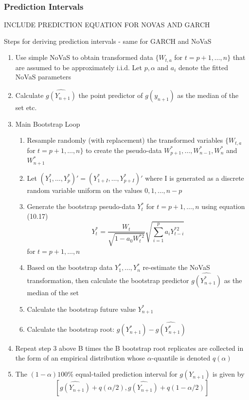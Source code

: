 \documentclass{beamer}
\begin{document}
\begin{frame}
\frametitle{Prediction Intervals}
INCLUDE PREDICTION EQUATION FOR NOVAS AND GARCH

Steps for deriving prediction intervals - same for GARCH and NoVaS

\begin{enumerate}
\item{Use simple NoVaS to obtain transformed data $\{W_{t,a}$ for $t=p+1,\dots,n \}$ that are assumed to be approximately i.i.d. Let $p, \alpha$ and $a_i$ denote the fitted NoVaS parameters}
\item{Calculate $\widehat{g(Y_{n+1})}$ the point predictor of $g(y_{n+1})$ as the median of the set etc.}

\item{Main Bootstrap Loop}
\begin{enumerate}
\item{Resample randomly (with replacement) the transformed variables  $\{W_{t,a}$ for $t=p+1,\dots,n \}$ to create the pseudo-data $W_{p+1}^*,\dots, W_{n-1}^*, W_{n}^*$ and $W_{n+1}^*$}
\item{Let $(Y_{1}^*,\dots,Y_{p}^*)' = (Y_{1+I}^*,\dots,Y_{p+I}^*)'$ where I is generated as a discrete random variable uniform on the values $0,1,\dots,n-p$}
\item{Generate the bootstrap pseudo-data $Y_{t}^*$ for $t=p+1,\dots,n$ using equation (10.17) $$ Y_{t}^* = \frac{W_{t}}{\sqrt{1-a_0W_{t}^{*2}}}\sqrt{\sum_{i=1}^{p} a_iY_{t-i}^{*2}}$$ for $t=p+1,\dots,n$}
\item{Based on the bootstrap data $Y_{1}^*,\dots,Y_{n}^*$ re-estimate the NoVaS transformation, then calculate the bootstrap predictor $\widehat{g(Y_{n+1}^*)}$ as the median of the set}
\item{Calculate the bootstrap future value $Y_{n+1}^*$}
\item{Calculate the bootstrap root: $g(Y_{n+1}^*) - \widehat{g(Y_{n+1}^*)}$}
\end{enumerate}

\item{Repeat step 3 above B times the B bootstrap root replicates are collected in the form of an empirical distribution whose $\alpha$-quantile is denoted $q(\alpha)$}
\item{The $(1-\alpha)100\%$ equal-tailed prediction interval for $g(Y_{n+1})$ is given by $$ [\widehat{g(Y_{n+1})} + q(\alpha/2), \widehat{g(Y_{n+1})} + q(1-\alpha/2)] $$}

\end{enumerate}
\end{frame}
\end{document}
